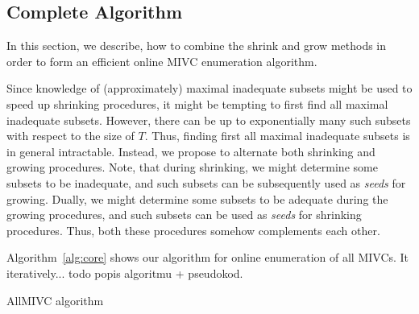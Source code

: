 \subsection{Complete Algorithm}
In this section, we describe, how to combine the shrink and grow methods in order to form an efficient online MIVC enumeration algorithm.

Since knowledge of (approximately) maximal inadequate subsets might be used to speed up shrinking procedures, it might be tempting to first find all maximal inadequate subsets. However, there can be up to exponentially many such subsets with respect to the size of $T$. Thus, finding first all maximal inadequate subsets is in general intractable. Instead, we propose to alternate both shrinking and growing procedures. Note, that during shrinking, we might determine some subsets to be inadequate, and such subsets can be subsequently used as \emph{seeds} for growing. Dually, we might determine some subsets to be adequate during the growing procedures, and such subsets can be used as \emph{seeds} for shrinking procedures. Thus, both these procedures somehow complements each other. 

Algorithm~\ref{alg:core} shows our algorithm for online enumeration of all MIVCs. It iteratively... todo popis algoritmu + pseudokod. 


\begin{algorithm}[!t]

\caption{AllMIVC algorithm}
\end{algorithm}




 